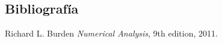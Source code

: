 \subsection{Bibliografía}

\begin{thebibliography}{1}

   Richard L. Burden {\em Numerical Analysis}, 9th edition, 2011.

\end{thebibliography}
